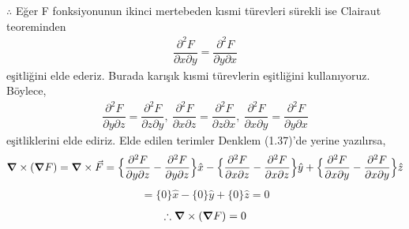 $ \therefore$ Eğer F fonksiyonunun ikinci mertebeden kısmi türevleri sürekli ise Clairaut teoreminden
\begin{align}
\dfrac{\partial^{2} F}{\partial x \partial y} = \dfrac{\partial^{2} F}{\partial y \partial x}
\end{align}
eşitliğini elde ederiz. Burada karışık kısmi türevlerin eşitliğini kullanıyoruz. Böylece,
\begin{align}
 \dfrac{\partial^{2} F}{\partial y \partial z}  = \dfrac{\partial^{2} F}{\partial z \partial y} , \ 
 \dfrac{\partial^{2} F}{\partial x \partial z}  = \dfrac{\partial^{2} F}{\partial z \partial x} , \
 \dfrac{\partial^{2} F}{\partial x \partial y}  = \dfrac{\partial^{2} F}{\partial y \partial x} 
\end{align}
eşitliklerini elde ediriz. Elde edilen terimler Denklem (1.37)'de yerine yazılırsa,
\begin{align}
\grad  \times ( \grad F ) = \grad \times \Vec{F} =
\Big\{ \dfrac{\partial^{2} F}{\partial y \partial z}  - \dfrac{\partial^{2} F}{\partial y \partial z} \Big\} \hat{x} - \Big\{ \dfrac{\partial^{2} F}{\partial x \partial z}  - \dfrac{\partial^{2} F}{\partial x \partial z} \Big\} \hat{y} + \Big\{ \dfrac{\partial^{2} F}{\partial x \partial y}  - \dfrac{\partial^{2} F}{\partial x \partial y} \Big\} \hat{z}
\end{align}
\begin{align}
= \Big\{ 0 \Big\} \hat{x} - 
\Big\{ 0 \Big\} \hat{y} + 
\Big\{ 0 \Big\} \hat{z} = 0
\end{align}
\begin{align}
    \therefore \grad  \times ( \grad F ) = 0
\end{align}